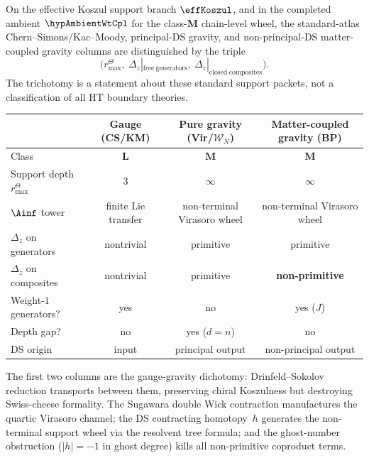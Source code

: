 \begin{corollary}%
\label{cor:gauge-gravity-dichotomy}%
%
%
On the effective Koszul support branch \(\effKoszul\), and in the
completed ambient \(\hypAmbientWtCpl\) for the class-\(\mathbf M\)
chain-level wheel, the standard-atlas Chern--Simons/Kac--Moody,
principal-DS gravity, and non-principal-DS matter-coupled gravity
columns are distinguished by the triple
\[
\bigl(r^\Theta_{\max},\ \Delta_z|_{\mathrm{free\ generators}},\
\Delta_z|_{\mathrm{closed\ composites}}\bigr).
\]
The trichotomy is a statement about these standard support packets, not
a classification of all HT boundary theories.

\medskip
\begin{center}
\small
\renewcommand{\arraystretch}{1.3}
\begin{tabular}{l|ccc}
& \textbf{Gauge (CS/KM)}
& \textbf{Pure gravity (Vir/$\mathcal{W}_N$)}
& \textbf{Matter-coupled gravity (BP)} \\
\hline
Class
 & $\mathbf{L}$
 & $\mathbf{M}$
 & $\mathbf{M}$ \\
Support depth \(r^\Theta_{\max}\)
 & $3$
 & $\infty$
 & $\infty$ \\
$\Ainf$ tower
 & finite Lie transfer
 & non-terminal Virasoro wheel
 & non-terminal Virasoro wheel \\
$\Delta_z$ on generators
 & nontrivial
 & primitive
 & primitive \\
$\Delta_z$ on composites
 & nontrivial
 & primitive
 & \textbf{non-primitive} \\
Weight-$1$ generators?
 & yes
 & no
 & yes ($J$) \\
Depth gap?
 & no
 & yes ($d = n$)
 & no \\
DS origin
 & input
 & principal output
 & non-principal output \\
\end{tabular}
\end{center}

\medskip\noindent
The first two columns are the gauge-gravity dichotomy:
Drinfeld--Sokolov reduction transports between them,
preserving chiral Koszulness but destroying Swiss-cheese
formality. The Sugawara double Wick contraction manufactures
the quartic Virasoro channel; the DS contracting homotopy~$h$ generates
the non-terminal support wheel via the resolvent tree formula;
and the ghost-number obstruction
($|h| = -1$ in ghost degree) kills all non-primitive
coproduct terms.


\end{corollary}
